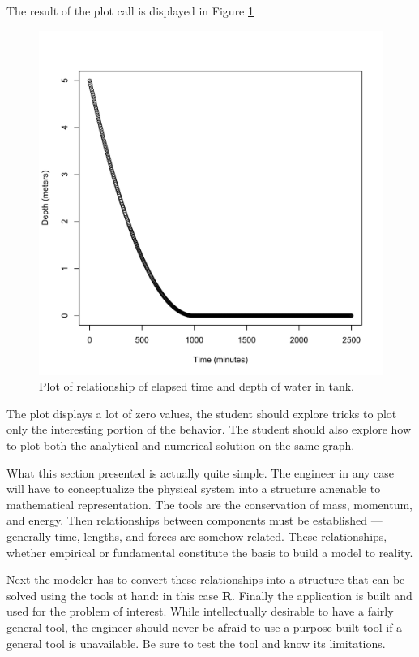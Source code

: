 The result of the plot call is displayed in Figure \ref{fig:Time2DrainR.pdf}

\begin{figure}[htbp] %
   \centering
   \includegraphics[width=5in]{./4-TankDrain/Time2DrainR.pdf} 
   \caption{Plot of relationship of elapsed time and depth of water in tank.}
   \label{fig:Time2DrainR.pdf}
\end{figure}

The plot displays a lot of zero values, the student should explore tricks to plot only the interesting portion of the behavior.  The student should also explore how to plot both the analytical and numerical solution on the same graph.

What this section presented is actually quite simple.  The engineer in any case will have to conceptualize the physical system into a structure amenable to mathematical representation.  The tools are the conservation of mass, momentum, and energy.  Then relationships between components must be established --- generally time, lengths, and forces are somehow related.  These relationships, whether empirical or fundamental constitute the basis to build a model to reality.

Next the modeler has to convert these relationships into a structure that can be solved using the tools at hand: in this case \textbf{R}.  Finally the application is built and used for the problem of interest.  While intellectually desirable to have a fairly general tool, the engineer should never be afraid to use a purpose built tool if a general tool is unavailable.  Be sure to test the tool and know its limitations.

